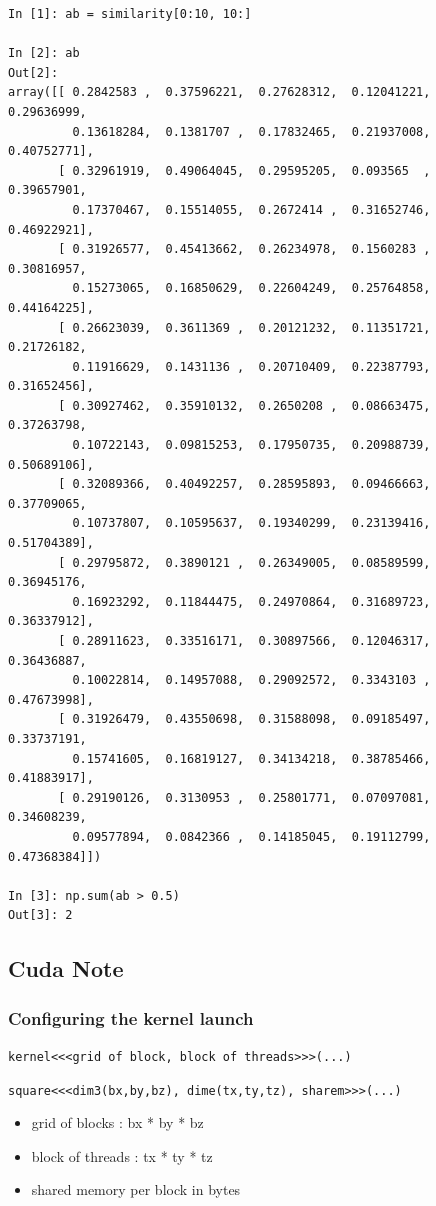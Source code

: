 \documentclass[11pt]{article}
\begin{document}
\begin{verbatim}
In [1]: ab = similarity[0:10, 10:]

In [2]: ab
Out[2]:
array([[ 0.2842583 ,  0.37596221,  0.27628312,  0.12041221,  0.29636999,
         0.13618284,  0.1381707 ,  0.17832465,  0.21937008,  0.40752771],
       [ 0.32961919,  0.49064045,  0.29595205,  0.093565  ,  0.39657901,
         0.17370467,  0.15514055,  0.2672414 ,  0.31652746,  0.46922921],
       [ 0.31926577,  0.45413662,  0.26234978,  0.1560283 ,  0.30816957,
         0.15273065,  0.16850629,  0.22604249,  0.25764858,  0.44164225],
       [ 0.26623039,  0.3611369 ,  0.20121232,  0.11351721,  0.21726182,
         0.11916629,  0.1431136 ,  0.20710409,  0.22387793,  0.31652456],
       [ 0.30927462,  0.35910132,  0.2650208 ,  0.08663475,  0.37263798,
         0.10722143,  0.09815253,  0.17950735,  0.20988739,  0.50689106],
       [ 0.32089366,  0.40492257,  0.28595893,  0.09466663,  0.37709065,
         0.10737807,  0.10595637,  0.19340299,  0.23139416,  0.51704389],
       [ 0.29795872,  0.3890121 ,  0.26349005,  0.08589599,  0.36945176,
         0.16923292,  0.11844475,  0.24970864,  0.31689723,  0.36337912],
       [ 0.28911623,  0.33516171,  0.30897566,  0.12046317,  0.36436887,
         0.10022814,  0.14957088,  0.29092572,  0.3343103 ,  0.47673998],
       [ 0.31926479,  0.43550698,  0.31588098,  0.09185497,  0.33737191,
         0.15741605,  0.16819127,  0.34134218,  0.38785466,  0.41883917],
       [ 0.29190126,  0.3130953 ,  0.25801771,  0.07097081,  0.34608239,
         0.09577894,  0.0842366 ,  0.14185045,  0.19112799,  0.47368384]])

In [3]: np.sum(ab > 0.5)
Out[3]: 2
\end{verbatim}

\subsection{Cuda Note}
\label{sec:orgheadline16}
\subsubsection{Configuring the kernel launch}
\label{sec:orgheadline7}
\texttt{kernel<<<grid of block, block of threads>>>(...)}

\texttt{square<<<dim3(bx,by,bz), dime(tx,ty,tz), sharem>>>(...)}

\begin{itemize}
\item grid of blocks : bx * by * bz
\item block of threads : tx * ty * tz
\item shared memory per block in bytes
\end{itemize}
\end{document}
